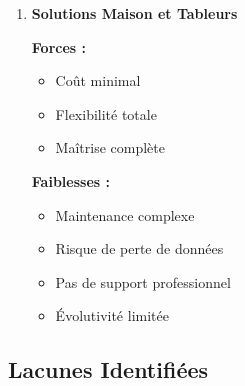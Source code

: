 \begin{enumerate}
    \item \textbf{Solutions Maison et Tableurs}
    
    \textbf{Forces :}
    \begin{itemize}
        \item Coût minimal
        \item Flexibilité totale
        \item Maîtrise complète
    \end{itemize}
    
    \textbf{Faiblesses :}
    \begin{itemize}
        \item Maintenance complexe
        \item Risque de perte de données
        \item Pas de support professionnel
        \item Évolutivité limitée
    \end{itemize}
\end{enumerate}

\subsection{Lacunes Identifiées}

